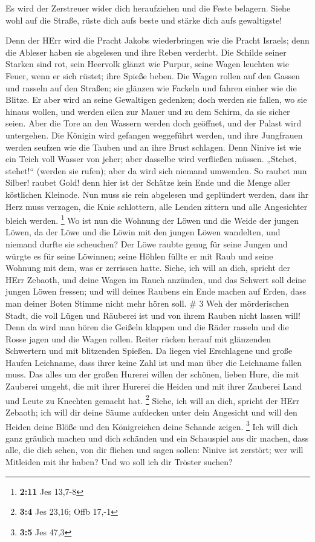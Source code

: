  Es wird der Zerstreuer wider dich heraufziehen und die
Feste belagern. Siehe wohl auf die Straße, rüste dich aufs beste und
stärke dich aufs gewaltigste!

 Denn der HErr wird die Pracht Jakobs wiederbringen wie die
Pracht Israels; denn die Ableser haben sie abgelesen und ihre Reben
verderbt.  Die Schilde seiner Starken sind rot, sein
Heervolk glänzt wie Purpur, seine Wagen leuchten wie Feuer, wenn er sich
rüstet; ihre Spieße beben.  Die Wagen rollen auf den Gassen
und rasseln auf den Straßen; sie glänzen wie Fackeln und fahren einher
wie die Blitze.  Er aber wird an seine Gewaltigen gedenken;
doch werden sie fallen, wo sie hinaus wollen, und werden eilen zur Mauer
und zu dem Schirm, da sie sicher seien.  Aber die Tore an
den Wassern werden doch geöffnet, und der Palast wird untergehen.
 Die Königin wird gefangen weggeführt werden, und ihre
Jungfrauen werden seufzen wie die Tauben und an ihre Brust schlagen.
 Denn Ninive ist wie ein Teich voll Wasser von jeher; aber
dasselbe wird verfließen müssen. „Stehet, stehet!{}`` (werden sie
rufen); aber da wird sich niemand umwenden.  So raubet nun
Silber! raubet Gold! denn hier ist der Schätze kein Ende und die Menge
aller köstlichen Kleinode.  Nun muss sie rein abgelesen und
geplündert werden, dass ihr Herz muss verzagen, die Knie schlottern,
alle Lenden zittern und alle Angesichter bleich werden. \footnote{\textbf{2:11}
  Jes 13,7-8}  Wo ist nun die Wohnung der Löwen und die
Weide der jungen Löwen, da der Löwe und die Löwin mit den jungen Löwen
wandelten, und niemand durfte sie scheuchen?  Der Löwe
raubte genug für seine Jungen und würgte es für seine Löwinnen; seine
Höhlen füllte er mit Raub und seine Wohnung mit dem, was er zerrissen
hatte.  Siehe, ich will an dich, spricht der HErr Zebaoth,
und deine Wagen im Rauch anzünden, und das Schwert soll deine jungen
Löwen fressen; und will deines Raubens ein Ende machen auf Erden, dass
man deiner Boten Stimme nicht mehr hören soll. \# 3  Weh der
mörderischen Stadt, die voll Lügen und Räuberei ist und von ihrem Rauben
nicht lassen will!  Denn da wird man hören die Geißeln
klappen und die Räder rasseln und die Rosse jagen und die Wagen rollen.
 Reiter rücken herauf mit glänzenden Schwertern und mit
blitzenden Spießen. Da liegen viel Erschlagene und große Haufen
Leichname, dass ihrer keine Zahl ist und man über die Leichname fallen
muss.  Das alles um der großen Hurerei willen der schönen,
lieben Hure, die mit Zauberei umgeht, die mit ihrer Hurerei die Heiden
und mit ihrer Zauberei Land und Leute zu Knechten gemacht hat.
\footnote{\textbf{3:4} Jes 23,16; Offb 17,-1}  Siehe, ich
will an dich, spricht der HErr Zebaoth; ich will dir deine Säume
aufdecken unter dein Angesicht und will den Heiden deine Blöße und den
Königreichen deine Schande zeigen. \footnote{\textbf{3:5} Jes 47,3}
 Ich will dich ganz gräulich machen und dich schänden und
ein Schauspiel aus dir machen,  dass alle, die dich sehen,
von dir fliehen und sagen sollen: Ninive ist zerstört; wer will
Mitleiden mit ihr haben? Und wo soll ich dir Tröster suchen?

